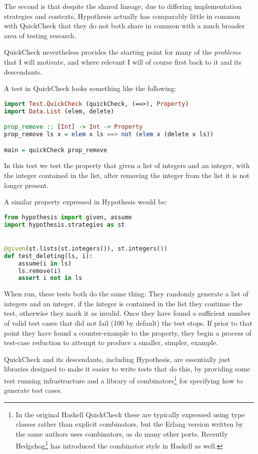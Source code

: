 The second is that despite the shared lineage,
due to differing implementation strategies and contexts,
Hypothesis actually has comparably little in common with QuickCheck that they do not both share in common with a much broader area of testing research.

QuickCheck nevertheless provides the starting point for many of the \emph{problems} that I will motivate,
and where relevant I will of course first back to it and its descendants.

A test in QuickCheck looks something like the following:

\begin{lstlisting}[language=Haskell]
import Test.QuickCheck (quickCheck, (==>), Property)
import Data.List (elem, delete)

prop_remove :: [Int] -> Int -> Property
prop_remove ls x = elem x ls ==> not (elem x (delete x ls))

main = quickCheck prop_remove
\end{lstlisting}

In this test we test the property that given a list of integers and an integer,
with the integer contained in the list,
after removing the integer from the list it is not longer present.

A similar property expressed in Hypothesis would be:

\begin{lstlisting}[language=Python]
from hypothesis import given, assume
import hypothesis.strategies as st


@given(st.lists(st.integers()), st.integers())
def test_deleting(ls, i):
    assume(i in ls)
    ls.remove(i)
    assert i not in ls
\end{lstlisting}

When run, these tests both do the same thing:
They randomly generate a list of integers and an integer,
if the integer is contained in the list they continue the test,
otherwise they mark it as invalid.
Once they have found a sufficient number of valid test cases that did not fail (100 by default) the test stops.
If prior to that point they have found a counter-example to the property,
they begin a process of test-case reduction to attempt to produce a smaller, simpler, example.

QuickCheck and its descendants,
including Hypothesis,
are essentially just libraries designed to make it easier to write tests that do this,
by providing some test running infrastructure and a library of combinators\footnote{
In the original Haskell QuickCheck these are typically expressed using type classes rather than explicit combinators,
but the Erlang version written by the same authors uses combinators,
as do many other ports.
Recently Hedgehog\footnote{\url{https://en.wikipedia.org/wiki/QuickCheck}} has introduced the combinator style in Haskell as well.
}
for specifying how to generate test cases.

